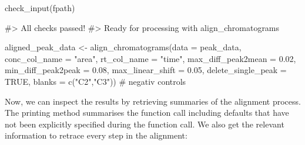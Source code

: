 \begin{Schunk}
\begin{Sinput}
check_input(fpath)
\end{Sinput}
\begin{Soutput}
#> All checks passed!
#> Ready for processing with align_chromatograms
\end{Soutput}
\end{Schunk}

\begin{Schunk}
\begin{Sinput}
aligned_peak_data <- align_chromatograms(data = peak_data,
                conc_col_name = "area",
                rt_col_name = "time",
                max_diff_peak2mean = 0.02,
                min_diff_peak2peak = 0.08,
                max_linear_shift = 0.05,
                delete_single_peak = TRUE,
                blanks = c("C2","C3")) # negativ controls
\end{Sinput}
\end{Schunk}

Now, we can inspect the results by retrieving summaries of the alignment
process. The printing method summarises the function call including
defaults that have not been explicitly specified during the function
call. We also get the relevant information to retrace every step in the
alignment:

